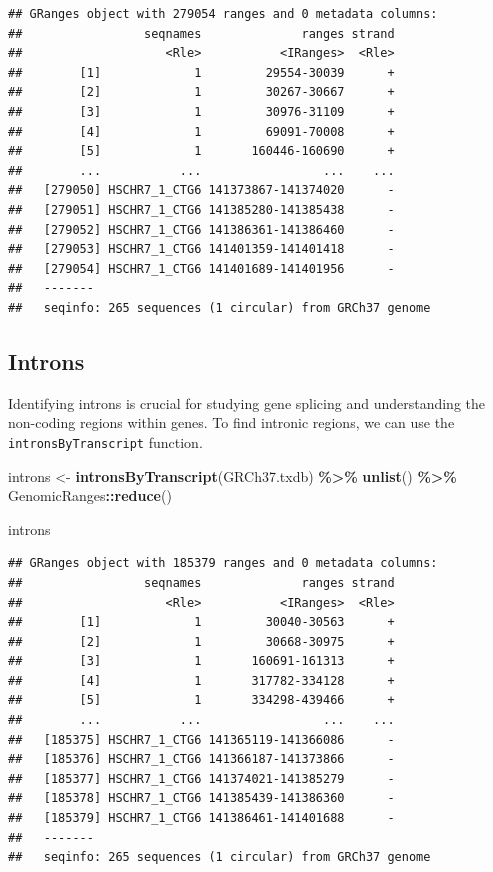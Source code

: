\documentclass[
]{book}
\newenvironment{Shaded}{\begin{snugshade}}{\end{snugshade}}
\newcommand{\FunctionTok}[1]{\textcolor[rgb]{0.13,0.29,0.53}{\textbf{#1}}}
\newcommand{\NormalTok}[1]{#1}
\newcommand{\OtherTok}[1]{\textcolor[rgb]{0.56,0.35,0.01}{#1}}
\newcommand{\SpecialCharTok}[1]{\textcolor[rgb]{0.81,0.36,0.00}{\textbf{#1}}}
\begin{document}
\begin{verbatim}
## GRanges object with 279054 ranges and 0 metadata columns:
##                 seqnames              ranges strand
##                    <Rle>           <IRanges>  <Rle>
##        [1]             1         29554-30039      +
##        [2]             1         30267-30667      +
##        [3]             1         30976-31109      +
##        [4]             1         69091-70008      +
##        [5]             1       160446-160690      +
##        ...           ...                 ...    ...
##   [279050] HSCHR7_1_CTG6 141373867-141374020      -
##   [279051] HSCHR7_1_CTG6 141385280-141385438      -
##   [279052] HSCHR7_1_CTG6 141386361-141386460      -
##   [279053] HSCHR7_1_CTG6 141401359-141401418      -
##   [279054] HSCHR7_1_CTG6 141401689-141401956      -
##   -------
##   seqinfo: 265 sequences (1 circular) from GRCh37 genome
\end{verbatim}

\hypertarget{introns}{%
\subsection{Introns}\label{introns}}

Identifying introns is crucial for studying gene splicing and understanding the non-coding regions within genes. To find intronic regions, we can use the \texttt{intronsByTranscript} function.

\begin{Shaded}
\begin{Highlighting}[]
\NormalTok{introns }\OtherTok{\textless{}{-}} \FunctionTok{intronsByTranscript}\NormalTok{(GRCh37.txdb) }\SpecialCharTok{\%\textgreater{}\%} 
  \FunctionTok{unlist}\NormalTok{() }\SpecialCharTok{\%\textgreater{}\%}
\NormalTok{  GenomicRanges}\SpecialCharTok{::}\FunctionTok{reduce}\NormalTok{()}

\NormalTok{introns}
\end{Highlighting}
\end{Shaded}

\begin{verbatim}
## GRanges object with 185379 ranges and 0 metadata columns:
##                 seqnames              ranges strand
##                    <Rle>           <IRanges>  <Rle>
##        [1]             1         30040-30563      +
##        [2]             1         30668-30975      +
##        [3]             1       160691-161313      +
##        [4]             1       317782-334128      +
##        [5]             1       334298-439466      +
##        ...           ...                 ...    ...
##   [185375] HSCHR7_1_CTG6 141365119-141366086      -
##   [185376] HSCHR7_1_CTG6 141366187-141373866      -
##   [185377] HSCHR7_1_CTG6 141374021-141385279      -
##   [185378] HSCHR7_1_CTG6 141385439-141386360      -
##   [185379] HSCHR7_1_CTG6 141386461-141401688      -
##   -------
##   seqinfo: 265 sequences (1 circular) from GRCh37 genome
\end{verbatim}
\end{document}
